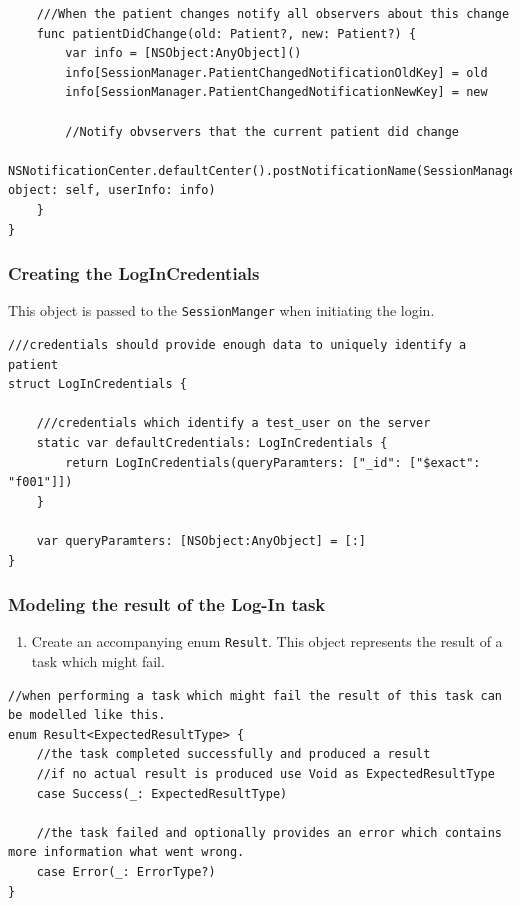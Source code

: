 \documentclass{article}
\begin{document}
\begin{enumerate}
\begin{verbatim}
    ///When the patient changes notify all observers about this change
    func patientDidChange(old: Patient?, new: Patient?) {
        var info = [NSObject:AnyObject]()
        info[SessionManager.PatientChangedNotificationOldKey] = old
        info[SessionManager.PatientChangedNotificationNewKey] = new

        //Notify obvservers that the current patient did change
        NSNotificationCenter.defaultCenter().postNotificationName(SessionManager.PatientChangedNotification, object: self, userInfo: info)
    }
}

\end{verbatim}

\end{enumerate}

\subsubsection{Creating the LogInCredentials}

This object is passed to the \texttt{SessionManger} when initiating the login.

\begin{verbatim}
///credentials should provide enough data to uniquely identify a patient
struct LogInCredentials {

    ///credentials which identify a test_user on the server
    static var defaultCredentials: LogInCredentials {
        return LogInCredentials(queryParamters: ["_id": ["$exact": "f001"]])
    }

    var queryParamters: [NSObject:AnyObject] = [:]
}
\end{verbatim}

\subsubsection{Modeling the result of the Log-In task}
\begin{enumerate}
\item
  Create an accompanying enum \texttt{Result}. This object represents
  the result of a task which might fail.
\end{enumerate}

\begin{verbatim}
//when performing a task which might fail the result of this task can be modelled like this.
enum Result<ExpectedResultType> {
    //the task completed successfully and produced a result
    //if no actual result is produced use Void as ExpectedResultType
    case Success(_: ExpectedResultType)

    //the task failed and optionally provides an error which contains more information what went wrong.
    case Error(_: ErrorType?)
}
\end{verbatim}
\end{document}
